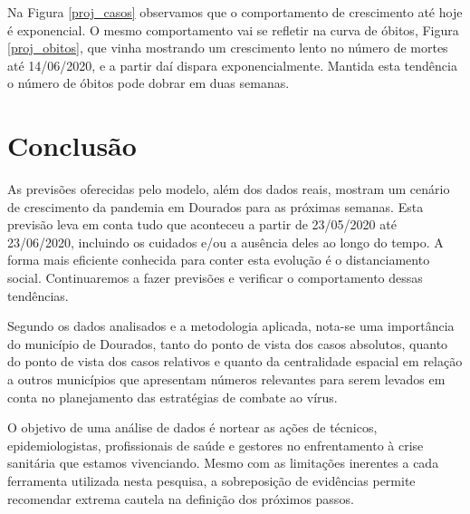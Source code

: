 \documentclass[12pt]{article}
\begin{document}
Na Figura \ref{proj_casos} observamos que o comportamento de crescimento até hoje é exponencial. O mesmo comportamento vai se refletir na curva de óbitos, Figura \ref{proj_obitos}, que vinha mostrando um crescimento lento no número de mortes até 14/06/2020, e a partir daí dispara exponencialmente. Mantida esta tendência o número de óbitos pode dobrar em duas semanas.   

\section{Conclusão}\label{conc}

As previsões oferecidas pelo modelo, além dos dados reais, mostram um cenário de crescimento da pandemia em Dourados para as próximas semanas. Esta previsão leva em conta tudo que aconteceu a partir de 23/05/2020 até 23/06/2020, incluindo os cuidados e/ou a ausência deles ao longo do tempo. A forma mais eficiente conhecida para conter esta evolução é o distanciamento social. Continuaremos a fazer previsões e verificar o comportamento dessas tendências.

Segundo os dados analisados e a metodologia aplicada, nota-se uma importância do município de Dourados, tanto do ponto de vista dos casos absolutos, quanto do ponto de vista dos casos relativos e quanto da centralidade espacial em relação a outros municípios que apresentam números relevantes para serem levados em conta no planejamento das estratégias de combate ao vírus.

O objetivo de uma análise de dados é nortear as ações de técnicos, epidemiologistas, profissionais de saúde e gestores no enfrentamento à crise sanitária que estamos vivenciando. Mesmo com as limitações inerentes a cada ferramenta utilizada nesta pesquisa, a sobreposição de evidências permite recomendar extrema cautela na definição dos próximos passos. 




\end{document}
